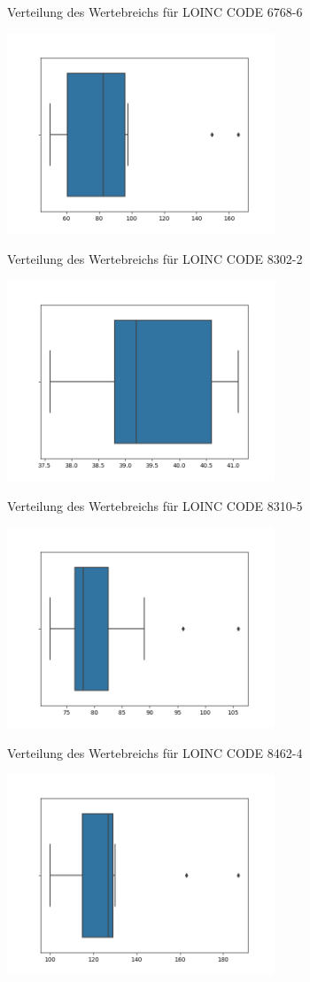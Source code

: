 \documentclass[12pt,a4paper,toc=bibliographynumbered,toc=indenttextentries]{scrreprt}
\begin{document}
\begin{center}
			\small{Verteilung des Wertebreichs für LOINC CODE 6768-6}
			
			\includegraphics[width=8cm]{Graphs/8302-2.png}
			
			\small{Verteilung des Wertebreichs für LOINC CODE 8302-2}
			
			\includegraphics[width=8cm]{Graphs/8310-5.png}
			
			\small{Verteilung des Wertebreichs für LOINC CODE 8310-5}
			
			\includegraphics[width=8cm]{Graphs/8462-4.png}
			
			\small{Verteilung des Wertebreichs für LOINC CODE 8462-4}
			
			\includegraphics[width=8cm]{Graphs/8480-6.png}
			

\end{center}
\end{document}
